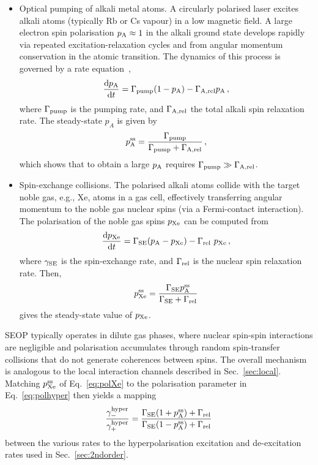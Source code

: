\documentclass[aps,prd,10pt,twocolumn,superscriptaddress,floatfix,nofootinbib,amsmath,amssymb,altaffilletter,preprintnumbers]{revtex4-1}
\begin{document}
\begin{itemize}
    \item Optical pumping of alkali metal atoms. A circularly polarised laser excites alkali atoms (typically Rb or Cs vapour) in a low magnetic field. A large electron spin polarisation $p_{\rm A}\approx 1$ in the alkali ground state develops rapidly via repeated excitation-relaxation cycles and from angular momentum conservation in the atomic transition. The dynamics of this process is governed by a rate equation~\cite{Walker_2011}, 
    \begin{equation}
        \frac{{\rm d}p_{\rm A}}{{\rm d}t} = \Gamma_{\rm pump} (1 - p_{\rm A}) - \Gamma_{{\rm A, rel}} p_{\rm A}\, ,
    \end{equation} 
    where $\Gamma_{\rm pump}$ is the pumping rate, and $\Gamma_{{\rm A, rel}}$ the total alkali spin relaxation rate. The steady-state  $p_A$ is given by
    \begin{equation}
        p_{\rm A}^{\rm ss}=\frac{\Gamma_{\rm pump}}{\Gamma_{\rm pump}+\Gamma_{\rm A, rel}}\, ,
        \label{eq:PA}
    \end{equation} 
    which shows that to obtain a large $p_{\rm A}$ requires $\Gamma_{\rm pump}\gg \Gamma_{\rm A, rel}$.
    
    \item Spin-exchange collisions. The polarised alkali atoms collide with the target noble gas, e.g., Xe, atoms in a gas cell, effectively transferring angular momentum to the noble gas nuclear spins (via a Fermi-contact interaction). The polarisation of the noble gas spins $p_{\rm Xe}$ can be computed from
    \begin{equation}
        \frac{{\rm d}p_{\rm Xe}}{{\rm d}t}=\Gamma_{\rm SE}(p_{\rm A}-p_{\rm Xe})-\Gamma_{\rm rel}~ p_{\rm Xe}\, ,
    \end{equation} 
    where  $\gamma_{\rm SE}$ is the spin-exchange rate, and $\Gamma_{\rm rel}$ is the nuclear spin relaxation rate. Then,
    \begin{equation}
        p^{\rm ss}_{\rm Xe}=\frac{\Gamma_{\rm SE}p_{\rm A}^{\rm ss}}{\Gamma_{\rm SE}+\Gamma_{\rm rel}}
        \label{eq:polXe}
    \end{equation}
    gives the steady-state value of $p_{\rm Xe}$.
\end{itemize}


SEOP typically operates in dilute gas phases, where nuclear spin-spin interactions are negligible and polarisation accumulates through random spin-transfer collisions that do not generate coherences between spins. The overall mechanism is analogous to the local interaction channels described in Sec.~\ref{sec:local}. Matching  $p^{\rm ss}_{\rm Xe}$ of Eq.~\eqref{eq:polXe} to the polarisation parameter in Eq.~\eqref{eq:polhyper} then yields a mapping 
\begin{equation}
    \frac{\gamma^{\rm hyper}_-}{\gamma^{\rm hyper}_+}=\frac{\Gamma_{\rm SE}(1+p_{\rm A}^{\rm ss})+\Gamma_{\rm rel}}{\Gamma_{\rm SE}(1-p_{\rm A}^{\rm ss})+\Gamma_{\rm rel}}
\end{equation}
between the various rates to the hyperpolarisation excitation and de-excitation rates used in Sec.~\ref{sec:2ndorder}. 
\end{document}
